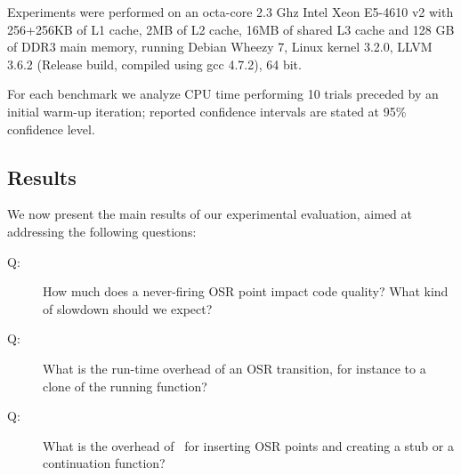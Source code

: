 Experiments were performed on an octa-core 2.3 Ghz Intel Xeon E5-4610 v2 with 256+256KB of L1 cache, 2MB of L2 cache, 16MB of shared L3 cache and 128 GB of DDR3 main memory, running Debian Wheezy 7, Linux kernel 3.2.0, LLVM 3.6.2 (Release build, compiled using gcc 4.7.2), 64 bit.

For each benchmark we analyze CPU time performing 10 trials preceded by an initial warm-up iteration; reported confidence intervals are stated at 95\% confidence level.

\subsection{Results}
We now present the main results of our experimental evaluation, aimed at addressing the following questions:

\begin{description}
\item[Q:] How much does a never-firing OSR point impact code quality? What kind of slowdown should we expect?
\item[Q:] What is the run-time overhead of an OSR transition, for instance to a clone of the running function?
\item[Q:] What is the overhead of \osrkit\ for inserting OSR points and creating a stub or a continuation function?
\end{description}


